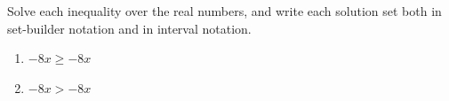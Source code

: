 Solve each inequality over the real numbers, and write each solution set both in set-builder notation and in interval notation.
\begin{enumerate}
\item[(a)] $-8x\ge-8x$
\item[(b)] $-8x>-8x$
\end{enumerate}
